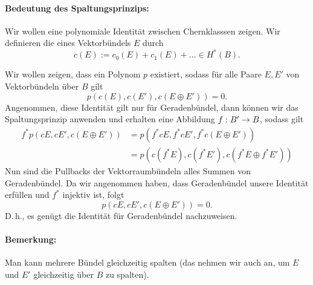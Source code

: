 \paragraph{Bedeutung des Spaltungsprinzips:} Wir wollen eine polynomiale Identität zwischen Chernklasssen zeigen.
\Def{}
Wir definieren die  eines Vektorbündels $E$ durch
\[ c(E) := c_0(E) + c_1(E) + \ldots \in H^*(B). \]


Wir wollen zeigen, dass ein Polynom $p$ existiert, sodass für alle Paare $E, E'$ von Vektorbündeln über $B$ gilt
\[ p(c(E), c(E'), c(E \oplus E')) = 0. \]
Angenommen, diese Identität gilt nur für Geradenbündel, dann können wir das Spaltungsprinzip anwenden und erhalten eine Abbildung $f : B' \overset{}{\rightarrow} B$, sodass gilt
\begin{align*}
f^*p(cE, cE', c(E\oplus E')) &= p(f^*cE, f^*cE', f^*c(E\oplus E'))\\
&= p(c(f^*E), c(f^*E'), c(f^*E \oplus f^*E'))
\end{align*}
Nun sind die Pullbacks der Vektorraumbündeln alles Summen von Geradenbündel. Da wir angenommen haben, dass Geradenbündel unsere Identität erfüllen und $f^*$ injektiv ist, folgt
\[ p(cE, cE', c(E\oplus E')) = 0. \]
D.\,h., es genügt die Identität für Geradenbündel nachzuweisen.
\paragraph{Bemerkung:} Man kann mehrere Bündel gleichzeitig spalten (das nehmen wir auch an, um $E$ und $E'$ gleichzeitig über $B$ zu spalten).

